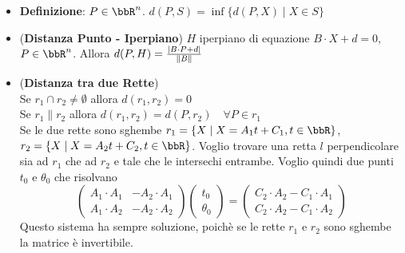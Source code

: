 \documentclass[a4paper,NoNotes,GeneralMath]{stdmdoc}
\begin{document}
	\begin{itemize}
		\item {\bf Definizione}: $P \in \bbR^n$. $d(P, S) = \inf \{d(P,X) \mid X \in S \}$
		\item ({\bf Distanza Punto - Iperpiano}) $H$ iperpiano di equazione $B \cdot X + d = 0$, $P \in \bbR^n$. Allora $d(P, H) = \frac{\mid B \cdot P + d \mid}{\| {B} \|}$
		\item ({\bf Distanza tra due Rette}) \\ Se $r_1 \cap r_2 \neq \emptyset$ allora $d(r_1, r_2) = 0$ \\ Se $r_1 \parallel r_2$ allora $d(r_1, r_2) = d(P, r_2) \quad \forall P \in r_1$ \\ Se le due rette sono sghembe $r_1 = \{X \mid X = A_1t+C_1, t \in \bbR\}$, $r_2 = \{X \mid X = A_2t+C_2, t \in \bbR\}$. Voglio trovare una retta $l$ perpendicolare sia ad $r_1$ che ad $r_2$ e tale che le intersechi entrambe. Voglio quindi due punti $t_0$ e $\theta_0$ che risolvano $$\left( \begin{array}{cc} A_1\cdot A_1 & -A_2\cdot A_1 \\ A_1\cdot A_2 & -A_2\cdot A_2 \end{array} \right)\left(\begin{array}{c} t_0 \\ \theta_0 \end{array}\right) = \left( \begin{array}{c} C_2\cdot A_2 -C_1\cdot A_1 \\ C_2 \cdot A_2 - C_1 \cdot A_2 \end{array}\right)$$ Questo sistema ha sempre soluzione, poichè se le rette $r_1$ e $r_2$ sono sghembe la matrice è invertibile.
	\end{itemize}

\end{document}
